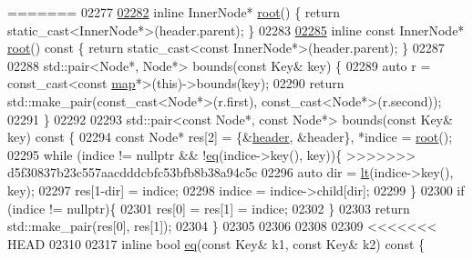 \begin{DoxyCode}
=======
02277 
\hyperlink{classaed2_1_1map_a07ab50eda249a57858a34037d4c4c7b2_a07ab50eda249a57858a34037d4c4c7b2}{02282}     \textcolor{keyword}{inline} InnerNode* \hyperlink{classaed2_1_1map_a07ab50eda249a57858a34037d4c4c7b2_a07ab50eda249a57858a34037d4c4c7b2}{root}() \{ \textcolor{keywordflow}{return} \textcolor{keyword}{static\_cast<}InnerNode*\textcolor{keyword}{>}(header.parent); \}
02283 
\hyperlink{classaed2_1_1map_a66fe019d885578cc52949409f80858eb_a66fe019d885578cc52949409f80858eb}{02285}     \textcolor{keyword}{inline} \textcolor{keyword}{const} InnerNode* \hyperlink{classaed2_1_1map_a66fe019d885578cc52949409f80858eb_a66fe019d885578cc52949409f80858eb}{root}()\textcolor{keyword}{ const }\{ \textcolor{keywordflow}{return} \textcolor{keyword}{static\_cast<}\textcolor{keyword}{const }InnerNode*\textcolor{keyword}{>}(header.parent); \}
02287 
02288     std::pair<Node*, Node*> bounds(\textcolor{keyword}{const} Key& key) \{
02289         \textcolor{keyword}{auto} r = \textcolor{keyword}{const\_cast<}\textcolor{keyword}{const }\hyperlink{classaed2_1_1map}{map}*\textcolor{keyword}{>}(\textcolor{keyword}{this})->bounds(key);
02290         \textcolor{keywordflow}{return} std::make\_pair(const\_cast<Node*>(r.first), const\_cast<Node*>(r.second));
02291     \}
02292 
02293     std::pair<const Node*, const Node*> bounds(\textcolor{keyword}{const} Key& key)\textcolor{keyword}{ const }\{
02294         \textcolor{keyword}{const} Node* res[2] = \{&\hyperlink{classaed2_1_1map_a92d93f905c8ad73fba18fdc7e8915cce_a92d93f905c8ad73fba18fdc7e8915cce}{header}, &header\}, *indice = \hyperlink{classaed2_1_1map_a07ab50eda249a57858a34037d4c4c7b2_a07ab50eda249a57858a34037d4c4c7b2}{root}();
02295         \textcolor{keywordflow}{while} (indice != \textcolor{keyword}{nullptr} && !\hyperlink{classaed2_1_1map_aebf6c09c424c39a874798165401b309e_aebf6c09c424c39a874798165401b309e}{eq}(indice->key(), key))\{
>>>>>>> d5f30837b23c557aacdddcbfc53bfb8b38a94c5c
02296             \textcolor{keyword}{auto} dir = \hyperlink{classaed2_1_1map_a0e5be36fae0693e4665bd2a615e7550a_a0e5be36fae0693e4665bd2a615e7550a}{lt}(indice->key(), key);
02297             res[1-dir] = indice;
02298             indice = indice->child[dir];
02299         \}
02300         \textcolor{keywordflow}{if} (indice != \textcolor{keyword}{nullptr})\{
02301             res[0] = res[1] = indice;
02302         \}
02303         \textcolor{keywordflow}{return} std::make\_pair(res[0], res[1]);      
02304     \}
02305 
02306 
02308 
02309 
<<<<<<< HEAD
02310 
02317     \textcolor{keyword}{inline} \textcolor{keywordtype}{bool} \hyperlink{classaed2_1_1map_ab45cb28bb215cd229383d88b96b3f624_ab45cb28bb215cd229383d88b96b3f624}{eq}(\textcolor{keyword}{const} Key& k1, \textcolor{keyword}{const} Key& k2)\textcolor{keyword}{ const }\{

\end{DoxyCode}
